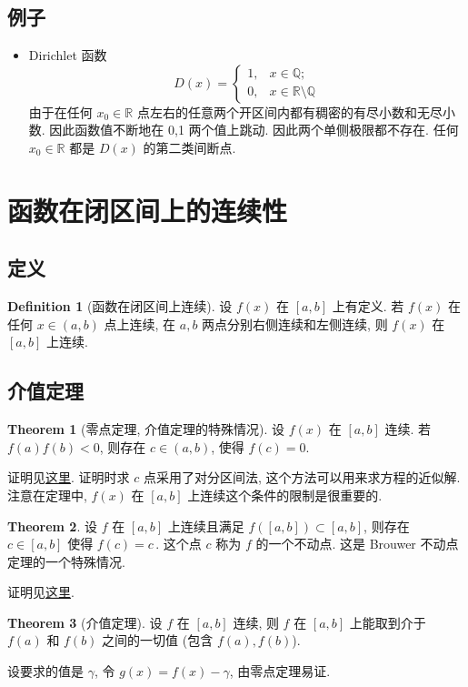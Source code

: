 \documentclass{book}
\newcommand{\R}{\mathbb{R}}
\newcommand{\Q}{\mathbb{Q}}
\numberwithin{equation}{section}
\numberwithin{figure}{section}
\theoremstyle{definition}
\newtheorem{definition}{Definition}
\newtheorem{theorem}{Theorem}[section]
\begin{document}
\subsection{例子}
\begin{itemize}
  \item Dirichlet 函数
    \begin{equation*}
      D(x)=
      \begin{cases}
	1,&x\in\Q;\\
	0,&x\in\R\setminus\Q
      \end{cases}
    \end{equation*}
    由于在任何 $x_0\in\R$ 点左右的任意两个开区间内都有稠密的有尽小数和无尽小数. 因此函数值不断地在 0,1 两个值上跳动. 因此两个单侧极限都不存在. 任何 $x_0\in\R$ 都是 $D(x)$ 的第二类间断点.
\end{itemize}
%
\section{函数在闭区间上的连续性}
\subsection{定义}
\begin{definition}[函数在闭区间上连续]
  设 $f(x)$ 在 $[a,b]$ 上有定义. 若 $f(x)$ 在任何 $x\in(a,b)$ 点上连续, 在 $a,b$ 两点分别右侧连续和左侧连续, 则 $f(x)$ 在 $[a,b]$ 上连续.
\end{definition}
%
\subsection{介值定理}
\begin{theorem}[零点定理, 介值定理的特殊情况]
  设 $f(x)$ 在 $[a,b]$ 连续. 若 $f(a)f(b)<0$, 则存在 $c\in(a,b)$, 使得 $f(c)=0$.
\end{theorem}
证明见\hyperlink{the:Intermediate_value_theorem}{这里}. 证明时求 $c$ 点采用了对分区间法, 这个方法可以用来求方程的近似解. 
注意在定理中, $f(x)$ 在 $[a,b]$ 上连续这个条件的限制是很重要的.

\begin{theorem}
  设 $f$ 在 $[a,b]$ 上连续且满足 $f([a,b])\subset [a,b]$, 则存在 $c\in[a,b]$ 使得 $f(c)=c$\,. 这个点 $c$ 称为 $f$ 的一个不动点. 这是 Brouwer 不动点定理的一个特殊情况.
\end{theorem}
证明见\hyperlink{proof:budongdian}{这里}.

\begin{theorem}[介值定理]
  设 $f$ 在 $[a,b]$ 连续, 则 $f$ 在 $[a,b]$ 上能取到介于 $f(a)$ 和 $f(b)$ 之间的一切值 (包含 $f(a),f(b)$).
\end{theorem}
设要求的值是 $\gamma$, 令 $g(x)=f(x)-\gamma$, 由零点定理易证.
\end{document}
